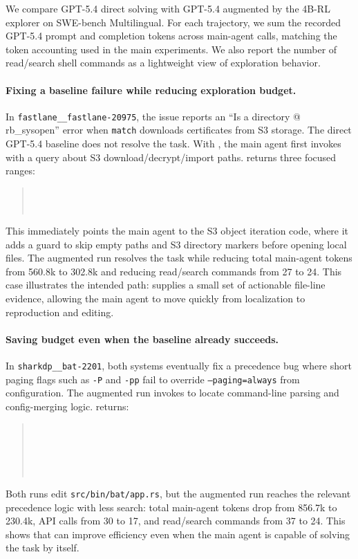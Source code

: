 We compare GPT-5.4 direct solving with GPT-5.4 augmented by the 4B-RL explorer on SWE-bench Multilingual.
For each trajectory, we sum the recorded GPT-5.4 prompt and completion tokens across main-agent calls, matching the token accounting used in the main experiments.
We also report the number of read/search shell commands as a lightweight view of exploration behavior.

\paragraph{Fixing a baseline failure while reducing exploration budget.}
In \texttt{fastlane\_\_fastlane-20975}, the issue reports an ``Is a directory @ rb\_sysopen'' error when \texttt{match} downloads certificates from S3 storage.
The direct GPT-5.4 baseline does not resolve the task.
With \approach, the main agent first invokes \approach with a query about S3 download/decrypt/import paths.
\approach returns three focused ranges:
\begin{quote}\small
{}\\
\\
\end{quote}
This immediately points the main agent to the S3 object iteration code, where it adds a guard to skip empty paths and S3 directory markers before opening local files.
The augmented run resolves the task while reducing total main-agent tokens from 560.8k to 302.8k and reducing read/search commands from 27 to 24.
This case illustrates the intended path: \approach supplies a small set of actionable file-line evidence, allowing the main agent to move quickly from localization to reproduction and editing.

\paragraph{Saving budget even when the baseline already succeeds.}
In \texttt{sharkdp\_\_bat-2201}, both systems eventually fix a precedence bug where short paging flags such as \texttt{-P} and \texttt{-pp} fail to override \texttt{--paging=always} from configuration.
The augmented run invokes \approach to locate command-line parsing and config-merging logic.
\approach returns:
\begin{quote}\small
{}\\
\\
\\
\\
\end{quote}
Both runs edit \texttt{src/bin/bat/app.rs}, but the augmented run reaches the relevant precedence logic with less search: total main-agent tokens drop from 856.7k to 230.4k, API calls from 30 to 17, and read/search commands from 37 to 24.
This shows that \approach can improve efficiency even when the main agent is capable of solving the task by itself.

